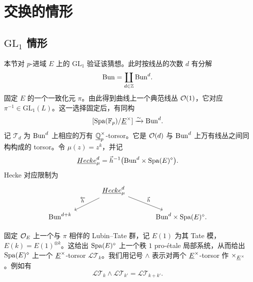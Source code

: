 %

\section{交换的情形}%

\subsection{\texorpdfstring{$\mathrm{GL}_1$}{GL1} 情形}%

\leavevmode{}本节对 $p$-进域 $E$ 上的 $\mathrm{GL}_1$ 验证该猜想。此时按线丛的次数 $d$ 有分解
\[
\mathrm{Bun} = \coprod_{d \in \mathbb{Z}} \mathrm{Bun}^d .
\]
固定 $E$ 的一个一致化元 $\pi$。由此得到曲线上一个典范线丛 $\mathcal{O}(1)$，它对应 $\pi^{-1} \in \mathrm{GL}_1(L)$。这一选择固定后，有同构
\[
[\mathrm{Spa}(\mathbb{F}_p)/\underline{E}^\times] \xrightarrow{\sim} \mathrm{Bun}^d .
\]
记 $\mathcal{T}_d$ 为 $\mathrm{Bun}^d$ 上相应的万有 $\underline{\mathbb{Q}}_p^\times$-torsor。它是 $\mathcal{O}(d)$ 与 $\mathrm{Bun}^d$ 上万有线丛之间同构构成的 torsor。令 $\mu(z) = z^k$，并记
\[
\underline{Hecke}^d_\mu = \vec{h}^{-1}\bigl(\mathrm{Bun}^d \times \mathrm{Spa}(E)^\diamond\bigr).
\]
Hecke 对应限制为
\[
\begin{tikzcd}[column sep=large]
& \ul{Hecke}^d_\mu \arrow[dl, "\overleftarrow{h}"'] \arrow[dr, "\vec{h}"] & \\
\Bun^{d+k} & & \Bun^d \times \Spa(E)^\diamond .
\end{tikzcd}
\]

固定 $\mathcal{O}_E$ 上一个与 $\pi$ 相伴的 Lubin–Tate 群，记 $E(1)$ 为其 Tate 模，$E(k) = E(1)^{\otimes k}$。这给出 $\mathrm{Spa}(E)^\diamond$ 上一个秩 $1$ pro-étale 局部系统，从而给出 $\mathrm{Spa}(E)^\diamond$ 上一个 $\underline{E}^\times$-torsor $\mathcal{LT}_k$。我们用记号 $\wedge$ 表示对两个 $\underline{E}^\times$-torsor 作 $\times_{\underline{E}^\times}$。例如有
\[
\mathcal{LT}_k \wedge \mathcal{LT}_{k'} = \mathcal{LT}_{k+k'} .
\]

